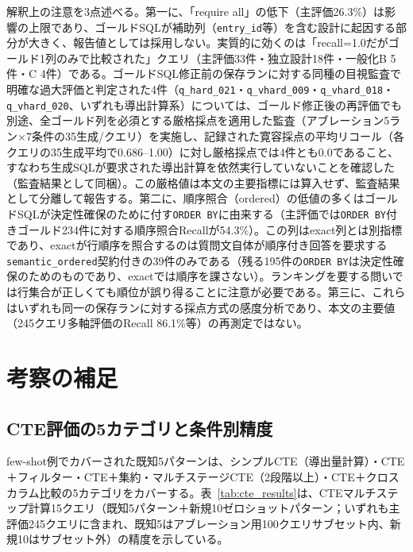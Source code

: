 \documentclass[twocolumn]{interact}
\begin{document}
解釈上の注意を3点述べる。第一に、「require all」の低下（主評価26.3\%）は影響の上限であり、ゴールドSQLが補助列（\texttt{entry\_id}等）を含む設計に起因する部分が大きく、報告値としては採用しない。実質的に効くのは「recall=1.0だがゴールド1列のみで比較された」クエリ（主評価33件・独立設計18件・一般化B 5件・C 4件）である。ゴールドSQL修正前の保存ランに対する同種の目視監査で明確な過大評価と判定された4件（\texttt{q\_hard\_021}・\texttt{q\_vhard\_009}・\texttt{q\_vhard\_018}・\texttt{q\_vhard\_020}、いずれも導出計算系）については、ゴールド修正後の再評価でも別途、全ゴールド列を必須とする厳格採点を適用した監査（アブレーション5ラン$\times$7条件の35生成/クエリ）を実施し、記録された寛容採点の平均リコール（各クエリの35生成平均で0.686--1.00）に対し厳格採点では4件とも0.0であること、すなわち生成SQLが要求された導出計算を依然実行していないことを確認した（監査結果として同梱）。この厳格値は本文の主要指標には算入せず、監査結果として分離して報告する。第二に、順序照合（ordered）の低値の多くはゴールドSQLが決定性確保のために付す\texttt{ORDER BY}に由来する（主評価では\texttt{ORDER BY}付きゴールド234件に対する順序照合Recallが54.3\%）。この列はexact列とは別指標であり、exactが行順序を照合するのは質問文自体が順序付き回答を要求する\texttt{semantic\_ordered}契約付きの39件のみである（残る195件の\texttt{ORDER BY}は決定性確保のためのものであり、exactでは順序を課さない）。ランキングを要する問いでは行集合が正しくても順位が誤り得ることに注意が必要である。第三に、これらはいずれも同一の保存ランに対する採点方式の感度分析であり、本文の主要値（245クエリ多軸評価のRecall 86.1\%等）の再測定ではない。

\section{考察の補足}
\label{sec:sup_discussion_details}

\subsection{CTE評価の5カテゴリと条件別精度}
\label{sec:cte_evaluation}

few-shot例でカバーされた既知5パターンは、シンプルCTE（導出量計算）・CTE＋フィルター・CTE＋集約・マルチステージCTE（2段階以上）・CTE＋クロスカラム比較の5カテゴリをカバーする。表~\ref{tab:cte_results}は、CTEマルチステップ計算15クエリ（既知5パターン＋新規10ゼロショットパターン；いずれも主評価245クエリに含まれ、既知5はアブレーション用100クエリサブセット内、新規10はサブセット外）の精度を示している。
\end{document}
